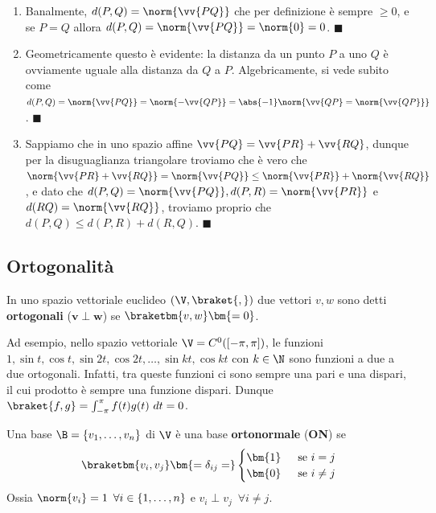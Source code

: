 \documentclass[11pt, a4paper, titlepage, oneside]{scrbook}
\begin{document}
\Dimostrazione \nopagebreak

\begin{enumerate}
    \item Banalmente, $d(P,Q) = \norm{\vv{PQ}}$ che per definizione è sempre $\geq 0$, e se $P = Q$ allora $d(P,Q) = \norm{\vv{PQ}} = \norm{0} = 0$. $\blacksquare$
    \item Geometricamente questo è evidente: la distanza da un punto $P$ a uno $Q$ è ovviamente uguale alla distanza da $Q$ a $P$. Algebricamente, si vede subito come \mbox{$d(P,Q) = \norm{\vv{PQ}} = \norm{-\vv{QP}} = \abs{-1} \norm{\vv{QP} = \norm{\vv{QP}}}$}. $\blacksquare$
    \item Sappiamo che in uno spazio affine $\vv{PQ} = \vv{PR} + \vv{RQ}$, dunque per la disuguaglianza triangolare troviamo che è vero che $\norm{\vv{PR} + \vv{RQ}} = \norm{\vv{PQ}} \leq \norm{\vv{PR}} + \norm{\vv{RQ}}$, e dato che \mbox{$d(P,Q) = \norm{\vv{PQ}}, d(P,R) = \norm{\vv{PR}}$} e $d(RQ) = \norm{\vv{RQ}}$, troviamo proprio che \mbox{$d(P,Q) \leq d(P,R) + d(R,Q)$}. $\blacksquare$
\end{enumerate}

\subsection{Ortogonalità}

\begin{Definizione}
\label{def-vettori-ortogonali}
In uno spazio vettoriale euclideo $(\V, \braket{,})$ due vettori $v,w$ sono detti \textbf{ortogonali} ($\bm{v \perp w}$) se $\braketbm{v,w} \bm{= 0}$. 
\end{Definizione}

Ad esempio, nello spazio vettoriale $\V = C^0([-\pi, \pi])$, le funzioni $1, \sin t, \cos t, \sin 2t, \cos 2t, \ldots, \sin kt, \cos kt$ con $k \in \N$ sono funzioni a due a due ortogonali. Infatti, tra queste funzioni ci sono sempre una pari e una dispari, il cui prodotto è sempre una funzione dispari. Dunque $\braket{f,g} = \int_{-\pi}^\pi f(t) g(t) \ dt = 0$.

\begin{Definizione}
\label{def-base-ortonormale-totale}
Una base $\B = \{v_1, \ldots, v_n\}$ di $\V$ è una base \textbf{ortonormale} (\textbf{ON}) se 
\[
\braketbm{v_i,v_j} \bm{= \delta_{ij} =}
\begin{cases}
\bm{1} &\enspace \text{se } i = j \\
\bm{0} &\enspace \text{se }i \neq j 
\end{cases}
\]
Ossia $\norm{v_i} = 1 \enspace \forall i \in \{1, \ldots, n\}$ e $v_i \perp v_j \enspace \forall i \neq j$.
\end{Definizione}
\end{document}

